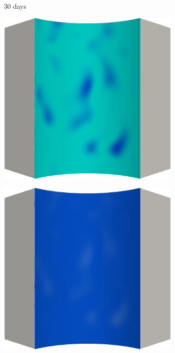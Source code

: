 \begin{figure}[!htbp]
  \begin{subfigure}{0.15\textwidth}
    \centering
    \caption*{30 days}
  \end{subfigure}
  \begin{subfigure}{0.19\textwidth}
    \centering
    \includegraphics[width=\textwidth]{Chapter5/figures/spallation/c.0003}
  \end{subfigure}
  \hspace{0.06\textwidth}
  \begin{subfigure}{0.19\textwidth}
    \centering
    \includegraphics[width=\textwidth]{Chapter5/figures/spallation/d.0003}

\end{subfigure}
\end{figure}
